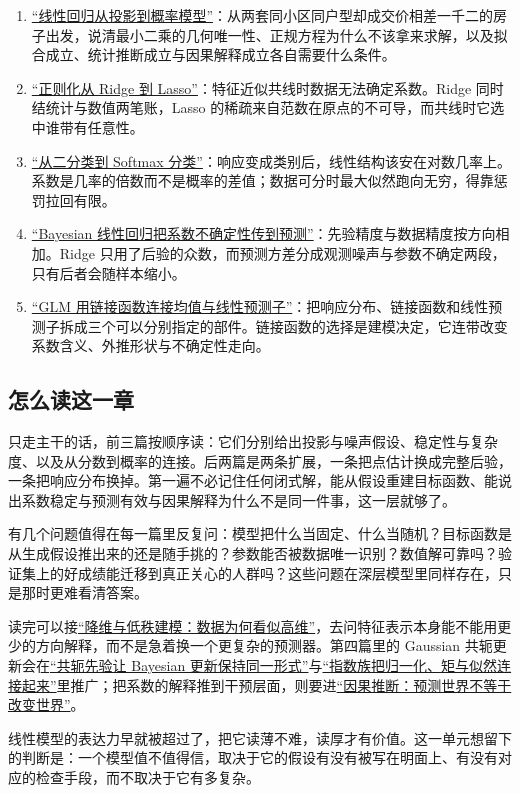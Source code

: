 \begin{enumerate}
\tightlist
\item
  \hyperref[sec:13-Machine-Learning/02-Linear-Models/01]{``线性回归从投影到概率模型''}：从两套同小区同户型却成交价相差一千二的房子出发，说清最小二乘的几何唯一性、正规方程为什么不该拿来求解，以及拟合成立、统计推断成立与因果解释成立各自需要什么条件。
\item
  \hyperref[sec:13-Machine-Learning/02-Linear-Models/02]{``正则化从 Ridge 到 Lasso''}：特征近似共线时数据无法确定系数。Ridge 同时结统计与数值两笔账，Lasso 的稀疏来自范数在原点的不可导，而共线时它选中谁带有任意性。
\item
  \hyperref[sec:13-Machine-Learning/02-Linear-Models/03]{``从二分类到 Softmax 分类''}：响应变成类别后，线性结构该安在对数几率上。系数是几率的倍数而不是概率的差值；数据可分时最大似然跑向无穷，得靠惩罚拉回有限。
\item
  \hyperref[sec:13-Machine-Learning/02-Linear-Models/04]{``Bayesian 线性回归把系数不确定性传到预测''}：先验精度与数据精度按方向相加。Ridge 只用了后验的众数，而预测方差分成观测噪声与参数不确定两段，只有后者会随样本缩小。
\item
  \hyperref[sec:13-Machine-Learning/02-Linear-Models/05]{``GLM 用链接函数连接均值与线性预测子''}：把响应分布、链接函数和线性预测子拆成三个可以分别指定的部件。链接函数的选择是建模决定，它连带改变系数含义、外推形状与不确定性走向。
\end{enumerate}

\subsection{怎么读这一章}

只走主干的话，前三篇按顺序读：它们分别给出投影与噪声假设、稳定性与复杂度、以及从分数到概率的连接。后两篇是两条扩展，一条把点估计换成完整后验，一条把响应分布换掉。第一遍不必记住任何闭式解，能从假设重建目标函数、能说出系数稳定与预测有效与因果解释为什么不是同一件事，这一层就够了。

有几个问题值得在每一篇里反复问：模型把什么当固定、什么当随机？目标函数是从生成假设推出来的还是随手挑的？参数能否被数据唯一识别？数值解可靠吗？验证集上的好成绩能迁移到真正关心的人群吗？这些问题在深层模型里同样存在，只是那时更难看清答案。

读完可以接\hyperref[ch:112]{``降维与低秩建模：数据为何看似高维''}，去问特征表示本身能不能用更少的方向解释，而不是急着换一个更复杂的预测器。第四篇里的 Gaussian 共轭更新会在\hyperref[sec:13-Machine-Learning/06-Probabilistic-Models/07]{``共轭先验让 Bayesian 更新保持同一形式''}与\hyperref[sec:13-Machine-Learning/06-Probabilistic-Models/06]{``指数族把归一化、矩与似然连接起来''}里推广；把系数的解释推到干预层面，则要进\hyperref[ch:120]{``因果推断：预测世界不等于改变世界''}。

线性模型的表达力早就被超过了，把它读薄不难，读厚才有价值。这一单元想留下的判断是：一个模型值不值得信，取决于它的假设有没有被写在明面上、有没有对应的检查手段，而不取决于它有多复杂。
